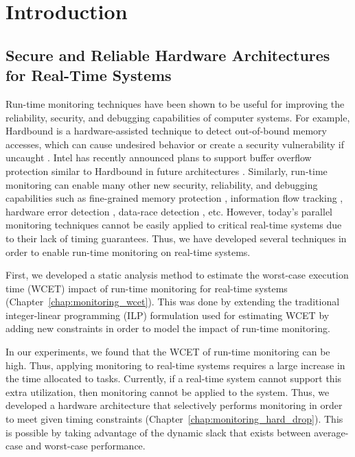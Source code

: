 \chapter{Introduction}
\label{chap:intro}

\section{Secure and Reliable Hardware Architectures for Real-Time Systems}
\label{sec:intro.security}

Run-time monitoring techniques have been shown to be useful for improving the
reliability, security, and debugging capabilities of computer systems. For
example, Hardbound is a hardware-assisted technique to detect out-of-bound
memory accesses, which can cause undesired behavior or create a security
vulnerability if uncaught \cite{hardbound-asplos08}. Intel has recently
announced plans to support buffer overflow protection similar to Hardbound in
future architectures \cite{intel-mpx}. Similarly, run-time monitoring can
enable many other new security, reliability, and debugging capabilities such as
fine-grained memory protection \cite{mondrian-asplos02}, information flow
tracking \cite{dift-asplos04, testudo-micro08}, hardware error detection
\cite{argus-micro07}, data-race detection \cite{radish-isca12, cord-hpca06},
etc.  However, today's parallel monitoring techniques cannot be easily applied
to critical real-time systems due to their lack of timing guarantees. Thus, we
have developed several techniques in order to enable run-time monitoring on
real-time systems.

First, we developed a static analysis method to estimate the worst-case
execution time (WCET) impact of run-time monitoring for real-time systems
(Chapter~\ref{chap:monitoring_wcet}). This was done by extending the
traditional integer-linear programming (ILP) formulation used for estimating
WCET by adding new constraints in order to model the impact of run-time
monitoring.

In our experiments, we found that the WCET of run-time monitoring can be high.
Thus, applying monitoring to real-time systems requires a large increase in the
time allocated to tasks. Currently, if a real-time system cannot support this
extra utilization, then monitoring cannot be applied to the system.  Thus, we
developed a hardware architecture that selectively performs monitoring in order
to meet given timing constraints (Chapter~\ref{chap:monitoring_hard_drop}).
This is possible by taking advantage of the dynamic slack that exists between
average-case and worst-case performance.

